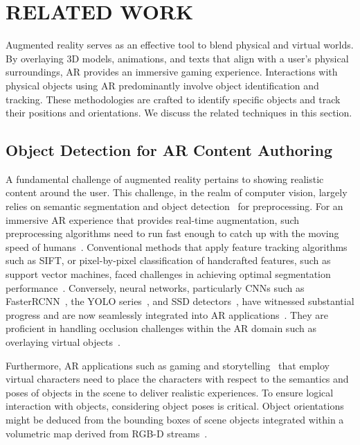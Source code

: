 \section{RELATED WORK}
Augmented reality serves as an effective tool to blend physical and virtual worlds. By overlaying 3D models, animations, and texts that align with a user's physical surroundings, AR provides an immersive gaming experience. Interactions with physical objects using AR predominantly involve object identification and tracking. These methodologies are crafted to identify specific objects and track their positions and orientations. We discuss the related techniques in this section.


\subsection{Object Detection for AR Content Authoring}
A fundamental challenge of augmented reality pertains to showing realistic content around the user. This challenge, in the realm of computer vision, largely relies on semantic segmentation and object detection~\cite{lee2021all} for preprocessing. For an immersive AR experience that provides real-time augmentation, such preprocessing algorithms need to run fast enough to catch up with the moving speed of humans~\cite{ko2020novel}. Conventional methods that apply feature tracking algorithms such as SIFT, or pixel-by-pixel classification of handcrafted features, such as support vector machines, faced challenges in achieving optimal segmentation performance~\cite{lee2021all}. Conversely, neural networks, particularly CNNs such as FasterRCNN~\cite{ren2015faster}, the YOLO series~\cite{redmon2018yolov3,simony2018complex}, and SSD detectors~\cite{liu2016ssd}, have witnessed substantial progress and are now seamlessly integrated into AR applications~\cite{zhang2020slimmer, tanzi2021real}. They are proficient in handling occlusion challenges within the AR domain such as overlaying virtual objects~\cite{roxas2018occlusion}. 

Furthermore, AR applications such as gaming and storytelling~\cite{liang2021scene,arstory,locationAR,snippet} that employ virtual characters need to place the characters with respect to the semantics and poses of objects in the scene to deliver realistic experiences. To ensure logical interaction with objects, considering object poses is critical. Object orientations might be deduced from the bounding boxes of scene objects integrated within a volumetric map derived from RGB-D streams~\cite{tahara2020retargetable}. 


